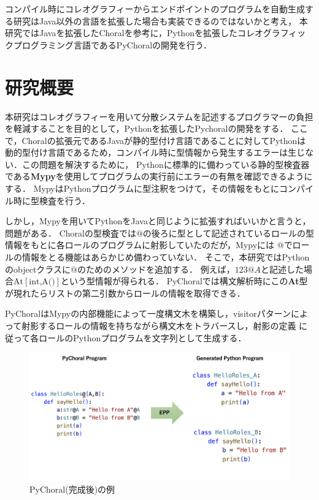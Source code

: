 \documentclass[11pt]{jarticle}
\begin{document}
コンパイル時にコレオグラフィーからエンドポイントのプログラムを自動生成する研究はJava以外の言語を拡張した場合も実装できるのではないかと考え，
本研究ではJavaを拡張したChoralを参考に，Pythonを拡張したコレオグラフィックプログラミング言語であるPyChoralの開発を行う．
\newpage
\section{研究概要}
本研究はコレオグラフィーを用いて分散システムを記述するプログラマーの負担を軽減することを目的として，Pythonを拡張したPychoralの開発をする．
ここで，Choralの拡張元であるJavaが静的型付け言語であることに対してPythonは動的型付け言語であるため，コンパイル時に型情報から発生するエラーは生じない．この問題を解決するために，
Pythonに標準的に備わっている静的型検査器である{\bf{Mypy}}\cite{mypy}を使用してプログラムの実行前にエラーの有無を確認できるようにする．
MypyはPythonプログラムに型注釈をつけて，その情報をもとにコンパイル時に型検査を行う．

しかし，Mypyを用いてPythonをJavaと同じように拡張すればいいかと言うと，問題がある．
Choralの型検査では$@$の後ろに型として記述されているロールの型情報をもとに各ロールのプログラムに射影していたのだが，Mypyには
$@$でロールの情報をとる機能はあらかじめ備わっていない．
そこで，本研究ではPythonのobjectクラスに$@$のためのメソッドを追加する．
例えば，$123@A$と記述した場合{\bf{$\text{At}[\text{int,A()}]$}}という型情報が得られる．
PyChoralでは構文解析時にこの{\bf{At}}型が現れたらリストの第二引数からロールの情報を取得できる．

PyChoralはMypyの内部機能によって一度構文木を構築し，visitorパターンによって射影するロールの情報を持ちながら構文木をトラバースし，射影の定義
に従って各ロールのPythonプログラムを文字列として生成する．

\begin{figure}[htbp]
  \begin{center}
  \includegraphics[width=130mm]{Pychoral_ex.png}
  \caption{PyChoral(完成後)の例}
  \end{center}
\end{figure}
\end{document}
